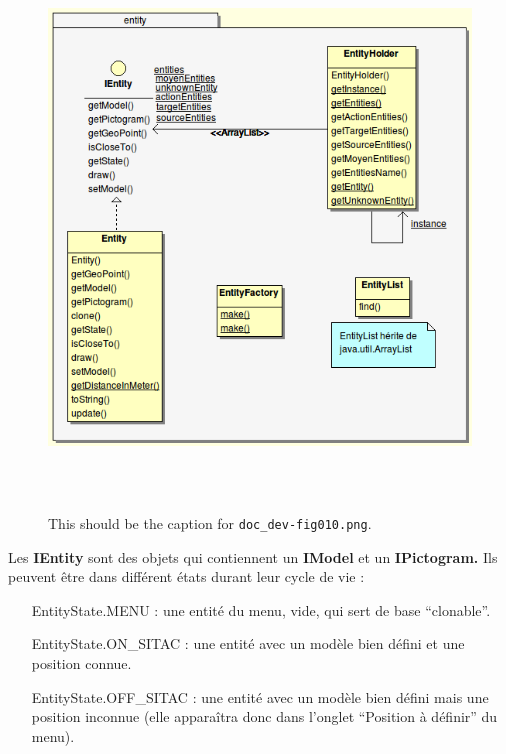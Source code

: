 \documentclass{article}
\begin{document}
\begin{figure}[htbp]
\begin{center}
\includegraphics[width=410pt, height=424pt]{doc_dev-fig010.png}
\caption{This should be the caption for \texttt{doc\_dev-fig010.png}.}
\end{center}
\end{figure}

Les \textbf{IEntity} sont des objets qui contiennent un \textbf{IModel } et un \textbf{IPictogram.} Ils peuvent être dans différent états durant leur cycle de vie :

\begin{itemize}

\item[EntityState.MENU : ] une entité du menu, vide, qui sert de base ``clonable''.

\item[EntityState.ON\_SITAC : ] une entité avec un modèle bien défini et une position connue.

\item[EntityState.OFF\_SITAC : ] une entité avec un modèle bien défini mais une position inconnue (elle apparaîtra donc dans l'onglet ``Position à définir'' du menu).

\end{itemize}
\end{document}
